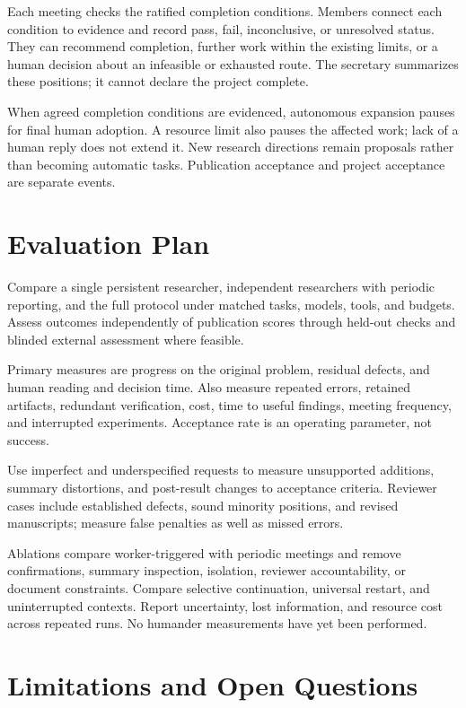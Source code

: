 \documentclass[11pt]{article}
\begin{document}
Each meeting checks the ratified completion conditions. Members connect each condition to evidence and record pass, fail, inconclusive, or unresolved status. They can recommend completion, further work within the existing limits, or a human decision about an infeasible or exhausted route. The secretary summarizes these positions; it cannot declare the project complete.

When agreed completion conditions are evidenced, autonomous expansion pauses for final human adoption. A resource limit also pauses the affected work; lack of a human reply does not extend it. New research directions remain proposals rather than becoming automatic tasks. Publication acceptance and project acceptance are separate events.

\section{Evaluation Plan}

Compare a single persistent researcher, independent researchers with periodic reporting, and the full protocol under matched tasks, models, tools, and budgets. Assess outcomes independently of publication scores through held-out checks and blinded external assessment where feasible.

Primary measures are progress on the original problem, residual defects, and human reading and decision time. Also measure repeated errors, retained artifacts, redundant verification, cost, time to useful findings, meeting frequency, and interrupted experiments. Acceptance rate is an operating parameter, not success.

Use imperfect and underspecified requests to measure unsupported additions, summary distortions, and post-result changes to acceptance criteria. Reviewer cases include established defects, sound minority positions, and revised manuscripts; measure false penalties as well as missed errors.

Ablations compare worker-triggered with periodic meetings and remove confirmations, summary inspection, isolation, reviewer accountability, or document constraints. Compare selective continuation, universal restart, and uninterrupted contexts. Report uncertainty, lost information, and resource cost across repeated runs. No humander measurements have yet been performed.

\section{Limitations and Open Questions}
\end{document}
